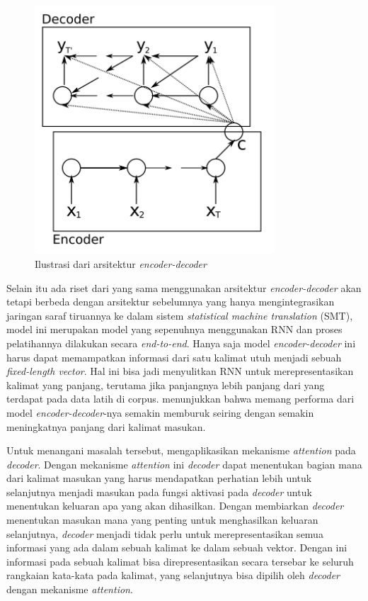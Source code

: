 \begin{figure}[h]
    \centering
    \includegraphics[width=0.8\textwidth]{resources/images/arsitektur-encoder-decoder.png}
    \caption{Ilustrasi dari arsitektur \textit{encoder-decoder} \parencite{Cho2014b}}
\end{figure}

Selain itu ada riset dari \textcite{Sutskever2014} yang sama menggunakan arsitektur \textit{encoder-decoder} akan tetapi berbeda dengan arsitektur sebelumnya yang hanya mengintegrasikan jaringan saraf tiruannya ke dalam sistem \textit{statistical machine translation} (SMT), model ini merupakan model yang sepenuhnya menggunakan RNN dan proses pelatihannya dilakukan secara \textit{end-to-end}. Hanya saja model \textit{encoder-decoder} ini harus dapat memampatkan informasi dari satu kalimat utuh menjadi sebuah \textit{fixed-length vector}. Hal ini bisa jadi menyulitkan RNN untuk merepresentasikan kalimat yang panjang, terutama jika panjangnya lebih panjang dari yang terdapat pada data latih di corpus. \textcite{Cho2014a} menunjukkan bahwa memang performa dari model \textit{encoder-decoder}-nya semakin memburuk seiring dengan semakin meningkatnya panjang dari kalimat masukan.
\bigskip

Untuk menangani masalah tersebut, \textcite{Bahdanau2015} mengaplikasikan mekanisme \textit{attention} pada \textit{decoder}. Dengan mekanisme \textit{attention} ini \textit{decoder} dapat menentukan bagian mana dari kalimat masukan yang harus mendapatkan perhatian lebih untuk selanjutnya menjadi masukan pada fungsi aktivasi pada \textit{decoder} untuk menentukan keluaran apa yang akan dihasilkan. Dengan membiarkan \textit{decoder} menentukan masukan mana yang penting untuk menghasilkan keluaran selanjutnya, \textit{decoder} menjadi tidak perlu untuk merepresentasikan semua informasi yang ada dalam sebuah kalimat ke dalam sebuah vektor. Dengan ini informasi pada sebuah kalimat bisa direpresentasikan secara tersebar ke seluruh rangkaian kata-kata pada kalimat, yang selanjutnya bisa dipilih oleh \textit{decoder} dengan mekanisme \textit{attention}.

